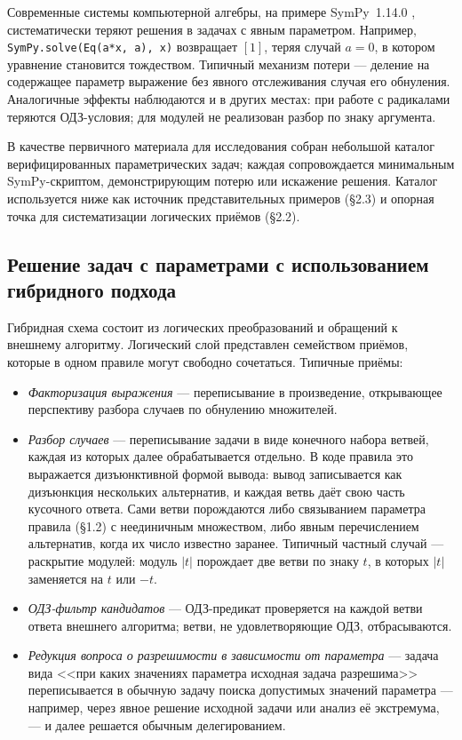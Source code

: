 \documentclass{intsys}
\begin{document}
Современные системы компьютерной алгебры, на примере SymPy~1.14.0
\cite{sympy}, систематически теряют решения в задачах с явным
параметром. Например, \texttt{SymPy.solve(Eq(a*x, a), x)} возвращает
$[1]$, теряя случай $a = 0$, в котором уравнение становится
тождеством. Типичный механизм потери --- деление на содержащее
параметр выражение без явного отслеживания случая его обнуления.
Аналогичные эффекты наблюдаются и в других местах: при работе с
радикалами теряются ОДЗ-условия; для модулей не реализован разбор
по знаку аргумента.

В качестве первичного материала для исследования собран небольшой
каталог верифицированных параметрических задач; каждая
сопровождается минимальным SymPy-скриптом, демонстрирующим потерю
или искажение решения. Каталог используется ниже как источник
представительных примеров (\S2.3) и опорная точка для систематизации
логических приёмов (\S2.2).

\subsection{Решение задач с параметрами с использованием гибридного подхода}

Гибридная схема состоит из логических преобразований и обращений к
внешнему алгоритму. Логический слой представлен семейством приёмов,
которые в одном правиле могут свободно сочетаться. Типичные приёмы:

\begin{itemize}
  \item \emph{Факторизация выражения} --- переписывание в
    произведение, открывающее перспективу разбора случаев по
    обнулению множителей.
  \item \emph{Разбор случаев} --- переписывание задачи в виде
    конечного набора ветвей, каждая из которых далее обрабатывается
    отдельно. В коде правила это выражается дизъюнктивной формой
    вывода: вывод записывается как дизъюнкция нескольких
    альтернатив, и каждая ветвь даёт свою часть кусочного ответа.
    Сами ветви порождаются либо связыванием параметра правила
    (\S1.2) с неединичным множеством, либо явным перечислением
    альтернатив, когда их число известно заранее. Типичный частный
    случай --- раскрытие модулей: модуль $|t|$ порождает две ветви
    по знаку $t$, в которых $|t|$ заменяется на $t$ или $-t$.
  \item \emph{ОДЗ-фильтр кандидатов} --- ОДЗ-предикат проверяется на
    каждой ветви ответа внешнего алгоритма; ветви, не удовлетворяющие
    ОДЗ, отбрасываются.
  \item \emph{Редукция вопроса о разрешимости в зависимости от
    параметра} --- задача вида <<при каких значениях параметра
    исходная задача разрешима>> переписывается в обычную задачу
    поиска допустимых значений параметра --- например, через явное
    решение исходной задачи или анализ её экстремума, --- и далее
    решается обычным делегированием.
\end{itemize}
\end{document}
